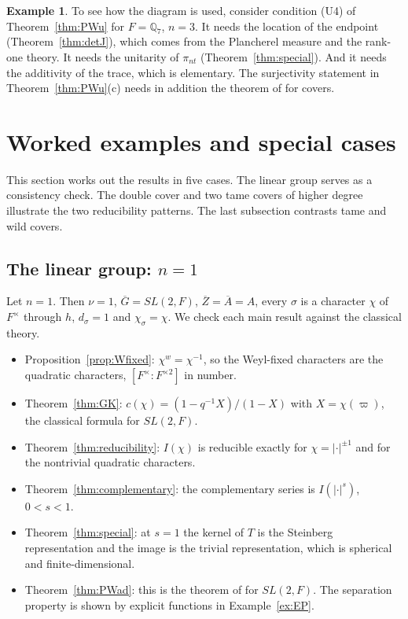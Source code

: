 \documentclass[12pt,letterpaper]{article}
\numberwithin{equation}{section}
\theoremstyle{definition}
\newtheorem{example}[theorem]{Example}
\newcommand{\Q}{\mathbb Q}
\newcommand{\vp}{\varpi}
\newcommand{\bG}{\overline{G}}
\newcommand{\bA}{\overline{A}}
\newcommand{\bZ}{\overline{Z}}
\begin{document}
\begin{example}\label{ex:dependency}
To see how the diagram is used, consider condition (U4) of Theorem~\ref{thm:PWu} for
$F=\Q_7$, $n=3$.  It needs the location of the endpoint (Theorem~\ref{thm:detJ}), which
comes from the Plancherel measure and the rank-one theory.  It needs the unitarity of
$\pi_{nt}$ (Theorem~\ref{thm:special}).  And it needs the additivity of the trace, which
is elementary.  The surjectivity statement in Theorem~\ref{thm:PWu}(c) needs in addition
the theorem of \cite{BDK86} for covers.
\end{example}

\section{Worked examples and special cases}\label{sec:examples}

This section works out the results in five cases.  The linear group serves as a
consistency check.  The double cover and two tame covers of higher degree illustrate the
two reducibility patterns.  The last subsection contrasts tame and wild covers.

\subsection{\texorpdfstring{The linear group: $n=1$}{The linear group: n=1}}

Let $n=1$.  Then $\nu=1$, $\bG=SL(2,F)$, $\bZ=\bA=A$, every $\sigma$ is a character $\chi$ of
$F^\times$ through $h$, $d_\sigma=1$ and $\chi_\sigma=\chi$.  We check each main result
against the classical theory.
\begin{itemize}[leftmargin=*,itemsep=1pt]
\item Proposition~\ref{prop:Wfixed}: $\chi^w=\chi^{-1}$, so the Weyl-fixed characters are the
quadratic characters, $[F^\times:F^{\times2}]$ in number.
\item Theorem~\ref{thm:GK}: $c(\chi)=(1-q^{-1}X)/(1-X)$ with $X=\chi(\vp)$, the classical
formula for $SL(2,F)$.
\item Theorem~\ref{thm:reducibility}: $I(\chi)$ is reducible exactly for
$\chi=|\cdot|^{\pm1}$ and for the nontrivial quadratic characters.
\item Theorem~\ref{thm:complementary}: the complementary series is $I(|\cdot|^s)$, $0<s<1$.
\item Theorem~\ref{thm:special}: at $s=1$ the kernel of $T$ is the Steinberg representation
and the image is the trivial representation, which is spherical and finite-dimensional.
\item Theorem~\ref{thm:PWad}: this is the theorem of \cite{BDK86} for $SL(2,F)$.  The
separation property is shown by explicit functions in Example~\ref{ex:EP}.
\end{itemize}
\end{document}
